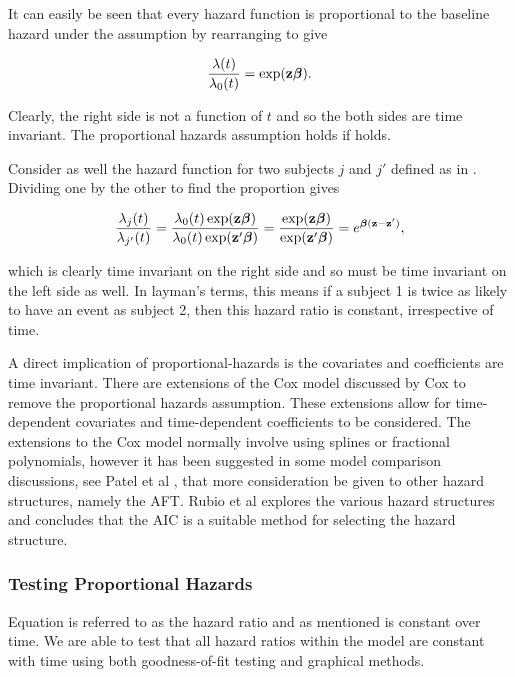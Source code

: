 It can easily be seen that every hazard function is proportional to the baseline hazard under the assumption by rearranging  to give

\begin{equation}\label{prop-hazard}
    \frac{\lambda(t)}{\lambda_0(t)}=\exp(\textbf{z}\boldsymbol{\beta}).
\end{equation}

Clearly, the right side is not a function of $t$ and so the both sides are time invariant. The proportional hazards assumption holds if  holds.

Consider as well the hazard function for two subjects $j$ and $j'$ defined as in . Dividing one by the other to find the proportion gives

\begin{equation}\label{hazard-ratio}
    \frac{\lambda_j(t)}{\lambda_{j'}(t)} =\frac{\lambda_0(t)\exp(\textbf{z}\boldsymbol{\beta})}{\lambda_0(t)\exp(\textbf{z}'\boldsymbol{\beta})}=\frac{\exp(\textbf{z}\boldsymbol{\beta})}{\exp(\textbf{z}'\boldsymbol{\beta})}=e^{\boldsymbol{\beta}(\textbf{z}-\textbf{z}')},
\end{equation}

which is clearly time invariant on the right side and so must be time invariant on the left side as well. In layman's terms, this means if a subject 1 is twice as likely to have an event as subject 2, then this hazard ratio is constant, irrespective of time.

A direct implication of proportional-hazards is the covariates and coefficients are time invariant. There are extensions of the Cox model discussed by Cox  to remove the proportional hazards assumption. These extensions allow for time-dependent covariates and time-dependent coefficients to be considered. The extensions to the Cox model normally involve using splines or fractional polynomials, however it has been suggested in some model comparison discussions, see Patel et al , that more consideration be given to other hazard structures, namely the AFT. Rubio et al  explores the various hazard structures and concludes that the AIC is a suitable method for selecting the hazard structure.

\subsubsection{Testing Proportional Hazards}

Equation  is referred to as the hazard ratio and as mentioned is constant over time. We are able to test that all hazard ratios within the model are constant with time using both goodness-of-fit testing and graphical methods.

